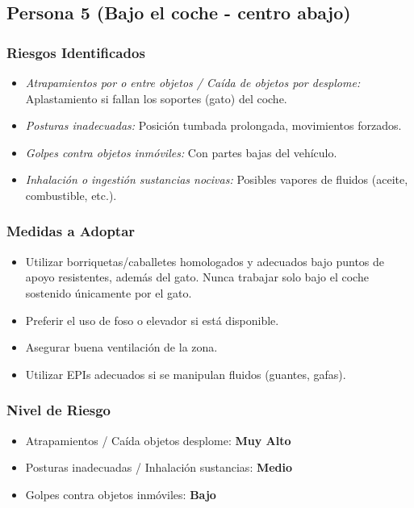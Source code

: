 \documentclass[12pt,a4paper]{article}
\begin{document}
	\bigskip\hrulefill\bigskip
	
	\subsection{Persona 5 (Bajo el coche - centro abajo)}
	
	\subsubsection{Riesgos Identificados}
	\begin{itemize}
		\item \textit{Atrapamientos por o entre objetos / Caída de objetos por desplome:} Aplastamiento si fallan los soportes (gato) del coche.
		\item \textit{Posturas inadecuadas:} Posición tumbada prolongada, movimientos forzados.
		\item \textit{Golpes contra objetos inmóviles:} Con partes bajas del vehículo.
		\item \textit{Inhalación o ingestión sustancias nocivas:} Posibles vapores de fluidos (aceite, combustible, etc.).
	\end{itemize}
	
	\subsubsection{Medidas a Adoptar}
	\begin{itemize}
		\item Utilizar borriquetas/caballetes homologados y adecuados bajo puntos de apoyo resistentes, además del gato. Nunca trabajar solo bajo el coche sostenido únicamente por el gato.
		\item Preferir el uso de foso o elevador si está disponible.
		\item Asegurar buena ventilación de la zona.
		\item Utilizar EPIs adecuados si se manipulan fluidos (guantes, gafas).
	\end{itemize}
	
	\subsubsection{Nivel de Riesgo}
	\begin{itemize}
		\item Atrapamientos / Caída objetos desplome: \textbf{Muy Alto}
		\item Posturas inadecuadas / Inhalación sustancias: \textbf{Medio}
		\item Golpes contra objetos inmóviles: \textbf{Bajo}
	\end{itemize}
	
\end{document}
